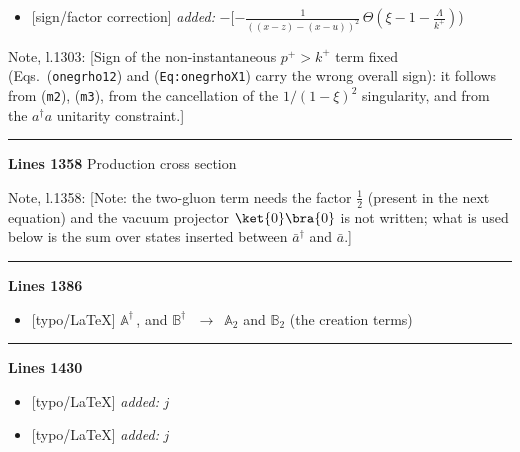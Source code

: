 \documentclass[10pt]{article}
\newenvironment{notebox}{\def\FrameCommand{{\color{notebar}\vrule width 1.5pt}\hspace{6pt}}\MakeFramed{\advance\hsize-\width\FrameRestore}\small}{\endMakeFramed}
\def\mf#1{\mathbb{#1}}
\begin{document}
\begin{itemize}[leftmargin=2.2em,itemsep=1pt,topsep=2pt]
\item[\textbf{l.1302}] \textsf{\small [sign/factor correction]} \emph{added:} $\displaystyle -$$\displaystyle [-\frac{1}{((x-z) - (x-u))^2}\,\Theta(\xi - 1 - \frac{\Lambda}{k^{+}})${\color{gray}\small)}
\end{itemize}
\begin{notebox}\textsf{\small Note, l.1303:} [Sign of the non-instantaneous $p^+>k^+$ term fixed (Eqs.~(\texttt{onegrho12}) and (\texttt{Eq:onegrhoX1}) carry the wrong overall sign): it follows from (\texttt{m2}), (\texttt{m3}), from the cancellation of the $1/(1-\xi)^2$ singularity, and from the $a^\dagger a$ unitarity constraint.]\end{notebox}
\noindent\rule{\linewidth}{0.3pt}\par\noindent\textbf{Lines 1358} \quad \textsf{Production cross section}\par
\begin{notebox}\textsf{\small Note, l.1358:} [Note: the two-gluon term needs the factor $\frac12$ (present in the next equation) and the vacuum projector $\ket{0}\bra{0}$ is not written; what is used below is the sum over states inserted between $\bar a^{\dagger}$ and $\bar a$.]\end{notebox}
\noindent\rule{\linewidth}{0.3pt}\par\noindent\textbf{Lines 1386}\par
\begin{itemize}[leftmargin=2.2em,itemsep=1pt,topsep=2pt]
\item[\textbf{l.1386}] \textsf{\small [typo/LaTeX]} $\mf{A}^\dagger\,$, and $\mf{B}^\dagger\,$\ $\longrightarrow$\ $\mf{A}_2$ and $\mf{B}_2$ (the creation terms)
\end{itemize}
\noindent\rule{\linewidth}{0.3pt}\par\noindent\textbf{Lines 1430} \par
\begin{itemize}[leftmargin=2.2em,itemsep=1pt,topsep=2pt]
\item[\textbf{l.1430}] \textsf{\small [typo/LaTeX]} \emph{added:} $\displaystyle j$
\item[\textbf{l.1430}] \textsf{\small [typo/LaTeX]} \emph{added:} $\displaystyle j$
\end{itemize}
\end{document}
